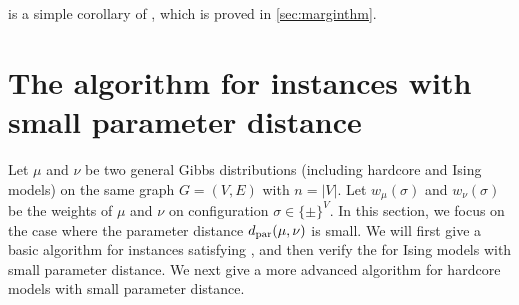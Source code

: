  is a simple corollary of , which is proved in \cref{sec:marginthm}.










\section{The algorithm for instances with small parameter distance}\label{sec:alg-main}
Let $\mu$ and $\nu$ be two general Gibbs distributions (including hardcore and Ising models) on the same graph $G=(V,E)$ with $n = |V|$. Let $w_\mu(\sigma)$ and $w_\nu(\sigma)$ be the weights of $\mu$ and $\nu$ on configuration $\sigma \in \{\pm\}^V$. In this section, we focus on the case where the parameter distance $d_\mathrm{par}(\mu,\nu)$ is small. We will first give a basic algorithm for instances satisfying , and then verify the  for Ising models with small parameter distance. 
We next give a more advanced algorithm for hardcore models with small parameter distance.

